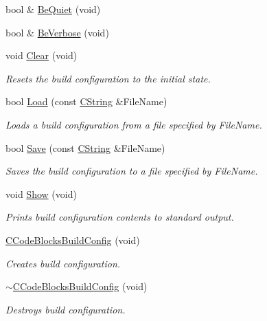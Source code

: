 \begin{DoxyCompactItemize}
\item 
bool \& \hyperlink{classCCodeBlocksBuildConfig_a15e45586cfc5f38f312f3b8060c685af}{Be\-Quiet} (void)
\item 
bool \& \hyperlink{classCCodeBlocksBuildConfig_a4aa4dc0e201872b23f6a635dd470b55a}{Be\-Verbose} (void)
\item 
void \hyperlink{classCCodeBlocksBuildConfig_a409b1815a04cf2f7eda0f49776a69b37}{Clear} (void)
\begin{DoxyCompactList}\small\item\em Resets the build configuration to the initial state. \end{DoxyCompactList}\item 
bool \hyperlink{classCCodeBlocksBuildConfig_a3dfc04a8d01dad69d1c9f416cb8f714c}{Load} (const \hyperlink{classCString}{C\-String} \&File\-Name)
\begin{DoxyCompactList}\small\item\em Loads a build configuration from a file specified by {\itshape File\-Name}. \end{DoxyCompactList}\item 
bool \hyperlink{classCCodeBlocksBuildConfig_adfeb4a66240e14efc36eff4559567907}{Save} (const \hyperlink{classCString}{C\-String} \&File\-Name)
\begin{DoxyCompactList}\small\item\em Saves the build configuration to a file specified by {\itshape File\-Name}. \end{DoxyCompactList}\item 
void \hyperlink{classCCodeBlocksBuildConfig_a326f3e278b74b930e6bf2fabacb88f62}{Show} (void)
\begin{DoxyCompactList}\small\item\em Prints build configuration contents to standard output. \end{DoxyCompactList}\item 
\hyperlink{classCCodeBlocksBuildConfig_a22f951d7b9ee49d6bde245cade888853}{C\-Code\-Blocks\-Build\-Config} (void)
\begin{DoxyCompactList}\small\item\em Creates build configuration. \end{DoxyCompactList}\item 
\hyperlink{classCCodeBlocksBuildConfig_ae5e68eaa19aeb1e5f6303f8849fed0fc}{$\sim$\-C\-Code\-Blocks\-Build\-Config} (void)
\begin{DoxyCompactList}\small\item\em Destroys build configuration. \end{DoxyCompactList}\end{DoxyCompactItemize}
